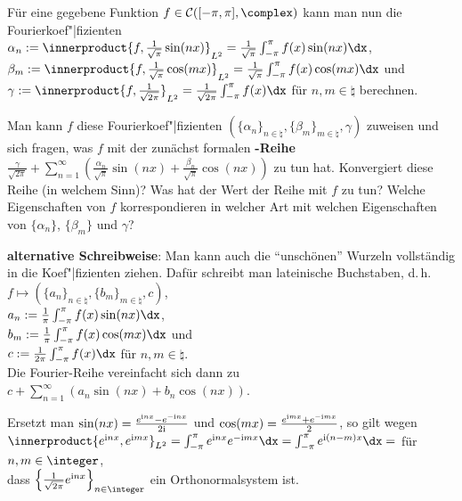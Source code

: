 \linie

Für eine gegebene Funktion $f \in \C([-\pi, \pi], \complex)$ kann man nun
die Fourierkoef"|fizienten\\
$\alpha_n := \innerproduct{f, \frac{1}{\sqrt{\pi}} \sin(nx)}_{L^2} =
\frac{1}{\sqrt{\pi}} \int_{-\pi}^\pi f(x)\sin(nx)\dx$,\\
$\beta_m := \innerproduct{f, \frac{1}{\sqrt{\pi}} \cos(mx)}_{L^2} =
\frac{1}{\sqrt{\pi}} \int_{-\pi}^\pi f(x)\cos(mx)\dx$ und\\
$\gamma := \innerproduct{f, \frac{1}{\sqrt{2\pi}}}_{L^2} =
\frac{1}{\sqrt{2\pi}} \int_{-\pi}^\pi f(x)\dx$
für $n, m \in \natural$ berechnen.

Man kann $f$ diese Fourierkoef"|fizienten
$(\{\alpha_n\}_{n \in \natural}, \{\beta_m\}_{m \in \natural}, \gamma)$
zuweisen und sich fragen, was $f$ mit der zunächst formalen
\textbf{-Reihe}
$\frac{\gamma}{\sqrt{2\pi}} +
\sum_{n=1}^\infty \left(\frac{\alpha_n}{\sqrt{\pi}} \sin(nx) +
\frac{\beta_n}{\sqrt{\pi}} \cos(nx)\right)$ zu tun hat.
Konvergiert diese Reihe (in welchem Sinn)?
Was hat der Wert der Reihe mit $f$ zu tun?
Welche Eigenschaften von $f$ korrespondieren in welcher Art mit welchen
Eigenschaften von $\{\alpha_n\}$, $\{\beta_m\}$ und $\gamma$?

\textbf{alternative Schreibweise}:
Man kann auch die "`unschönen"' Wurzeln vollständig in die Koef"|fizienten
ziehen.
Dafür schreibt man lateinische Buchstaben, d.\,h.
$f \mapsto (\{a_n\}_{n \in \natural}, \{b_m\}_{m \in \natural}, c)$,\\
$a_n := \frac{1}{\pi} \int_{-\pi}^\pi f(x)\sin(nx)\dx$,\\
$b_m := \frac{1}{\pi} \int_{-\pi}^\pi f(x)\cos(mx)\dx$ und\\
$c := \frac{1}{2\pi} \int_{-\pi}^\pi f(x)\dx$ für $n, m \in \natural$.\\
Die Fourier-Reihe vereinfacht sich dann zu
$c + \sum_{n=1}^\infty (a_n \sin(nx) + b_n \cos(nx))$.

\linie
\pagebreak

Ersetzt man $\sin(nx) = \frac{e^{\mathrm{i} nx} - e^{-\mathrm{i} nx}}{2\mathrm{i}}$ und
$\cos(mx) = \frac{e^{\mathrm{i} mx} + e^{-\mathrm{i} mx}}{2}$, so gilt wegen\\
$\innerproduct{e^{\i nx}, e^{\i mx}}_{L^2} = \int_{-\pi}^\pi e^{\i nx} e^{-\i mx}\dx =
\int_{-\pi}^\pi e^{\i (n - m)x}\dx =$
für $n, m \in \integer$,\\
dass $\left\{\frac{1}{\sqrt{2\pi}} e^{\i nx}\right\}_{n \in \integer}$
ein Orthonormalsystem ist.

